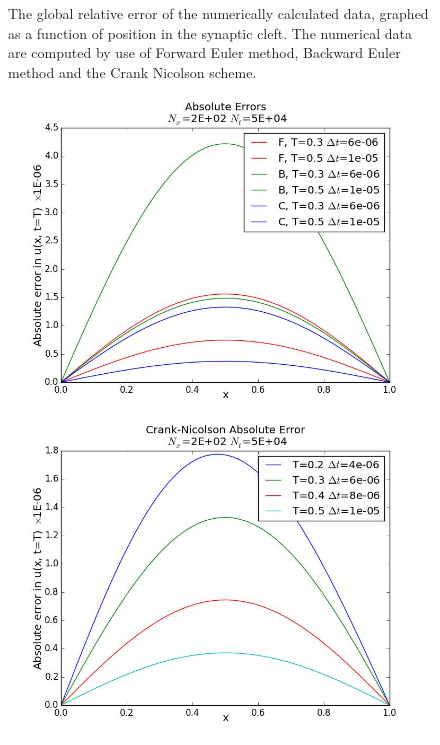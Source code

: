 \documentclass[12pt]{article}
\begin{document}
\begin{flushleft}
\begin{figure}[!h]
\begin{center}
\caption{\label{fig:rel_error_all}The global relative error of the numerically calculated data, graphed as a function of position in the synaptic cleft. The numerical data are computed by use of Forward Euler method, Backward Euler method and the Crank Nicolson scheme.}
\end{center}
\end{figure}

\begin{figure}[!h]
  \begin{minipage}{\linewidth}
    \centering
    {\includegraphics[scale=0.27]{abs_error_all}}
     {\includegraphics[scale=0.27]{crank_abs_error_4T}}

\end{minipage}
\end{figure}
\end{flushleft}
\end{document}
